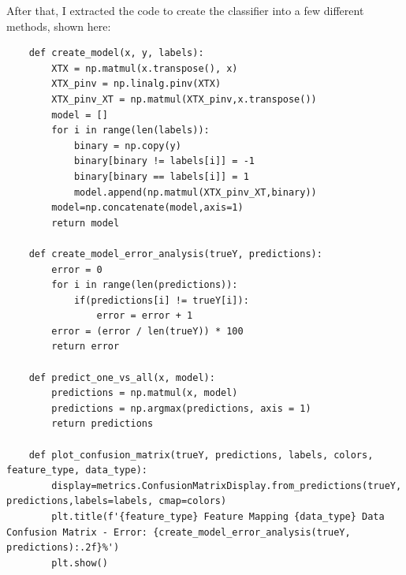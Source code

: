 \documentclass{article}
\begin{document}
After that, I extracted the code to create the classifier into a few different methods, shown here:
\begin{lstlisting}
    def create_model(x, y, labels):
        XTX = np.matmul(x.transpose(), x)
        XTX_pinv = np.linalg.pinv(XTX)
        XTX_pinv_XT = np.matmul(XTX_pinv,x.transpose())
        model = []
        for i in range(len(labels)):
            binary = np.copy(y)
            binary[binary != labels[i]] = -1
            binary[binary == labels[i]] = 1
            model.append(np.matmul(XTX_pinv_XT,binary))
        model=np.concatenate(model,axis=1)
        return model

    def create_model_error_analysis(trueY, predictions):
        error = 0
        for i in range(len(predictions)):
            if(predictions[i] != trueY[i]):
                error = error + 1
        error = (error / len(trueY)) * 100
        return error

    def predict_one_vs_all(x, model):
        predictions = np.matmul(x, model)
        predictions = np.argmax(predictions, axis = 1)
        return predictions

    def plot_confusion_matrix(trueY, predictions, labels, colors, feature_type, data_type):
        display=metrics.ConfusionMatrixDisplay.from_predictions(trueY, predictions,labels=labels, cmap=colors)
        plt.title(f'{feature_type} Feature Mapping {data_type} Data Confusion Matrix - Error: {create_model_error_analysis(trueY, predictions):.2f}%')
        plt.show()
\end{lstlisting}

\FloatBarrier
\end{document}
